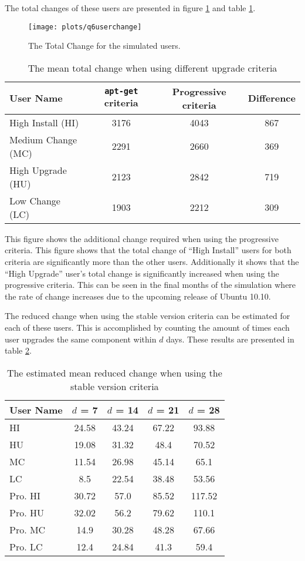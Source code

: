 The total changes of these users are presented in figure \ref{exp.q6userchange} and table \ref{exp.tblq6change}.
\begin{figure}[htp]
\begin{center}
  \texttt{[image: plots/q6userchange]}
  \caption{The Total Change for the simulated users.}
  \label{exp.q6userchange}
\end{center}
\end{figure}

\begin{table}[h!]
\centering
\begin{tabular}{|l | c | c | c | }
\hline
User Name 				& \texttt{apt-get} criteria 		& Progressive criteria 	& Difference	\\ \hline
High Install (HI)			& 3176			& 4043 	& 867	\\
Medium Change (MC)			& 2291			& 2660 	& 369 	\\
High Upgrade (HU)			& 2123			& 2842	& 719   \\
Low Change 	(LC)			& 1903			& 2212 	& 309   \\ \hline
\end{tabular}
\caption{The mean total change when using different upgrade criteria}
\label{exp.tblq6change}
\end{table}

This figure shows the additional change required when using the progressive criteria.
This figure shows that the total change of  ``High Install'' users for both criteria are significantly more than the other users.
Additionally it shows that the ``High Upgrade'' user's total change is significantly increased when using the progressive criteria.
This can be seen in the final months of the simulation where the rate of change increases due to the upcoming release of Ubuntu 10.10.

The reduced change when using the stable version criteria can be estimated for each of these users.
This is accomplished by counting the amount of times each user upgrades the same component within $d$ days.
These results are presented in table \ref{exp.tblq6sv}.
\begin{table}[h!]
\centering
\begin{tabular}{|l | c | c | c | c |}
\hline
User Name 	& $d$ = 7 	&  $d$ = 14 	&	$d$ = 21 	&	$d$ = 28 	\\ \hline
HI 			&24.58 	&	43.24&	 67.22&	 93.88\\
HU 			&19.08 	&	31.32&	 48.4&	 70.52\\
MC 			&11.54 	&	26.98&	 45.14&	 65.1\\
LC 			&8.5 	&	22.54&	 38.48&	 53.56\\
Pro. HI 	&30.72 	&	57.0&	 85.52&	 117.52\\
Pro. HU 	&32.02 	&	56.2&	 79.62&	 110.1\\
Pro. MC 	&14.9 	&	30.28&	 48.28&	 67.66\\
Pro. LC 	&12.4 	&	24.84&	 41.3&	 59.4\\ \hline
\end{tabular}
\caption{The estimated mean reduced change when using the stable version criteria}
\label{exp.tblq6sv}
\end{table}

